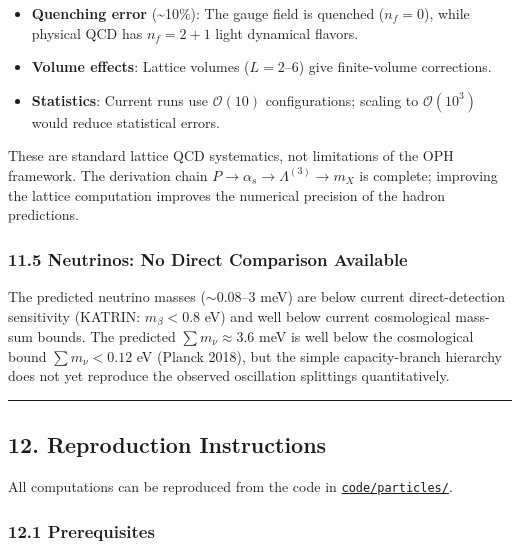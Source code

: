 \begin{itemize}
\tightlist
\item
  \textbf{Quenching error} (\textasciitilde10\%): The gauge field is quenched (\(n_f = 0\)), while physical QCD has \(n_f = 2+1\) light dynamical flavors.
\item
  \textbf{Volume effects}: Lattice volumes (\(L = 2\)--\(6\)) give finite-volume corrections.
\item
  \textbf{Statistics}: Current runs use \(\mathcal{O}(10)\) configurations; scaling to \(\mathcal{O}(10^3)\) would reduce statistical errors.
\end{itemize}

These are standard lattice QCD systematics, not limitations of the OPH framework. The derivation chain \(P \to \alpha_s \to \Lambda^{(3)} \to m_X\) is complete; improving the lattice computation improves the numerical precision of the hadron predictions.

\subsubsection{11.5 Neutrinos: No Direct Comparison Available}\label{115-neutrinos-no-direct-comparison-available}

The predicted neutrino masses (\(\sim 0.08\)--\(3\) meV) are below current direct-detection sensitivity (KATRIN: \(m_\beta < 0.8\) eV) and well below current cosmological mass-sum bounds. The predicted \(\sum m_\nu \approx 3.6\) meV is well below the cosmological bound \(\sum m_\nu < 0.12\) eV (Planck 2018), but the simple capacity-branch hierarchy does not yet reproduce the observed oscillation splittings quantitatively.

\begin{center}\rule{0.5\linewidth}{0.5pt}\end{center}

\subsection{12. Reproduction Instructions}\label{12-reproduction-instructions}

All computations can be reproduced from the code in \href{../code/particles/}{\texttt{code/particles/}}.

\subsubsection{12.1 Prerequisites}\label{121-prerequisites}

